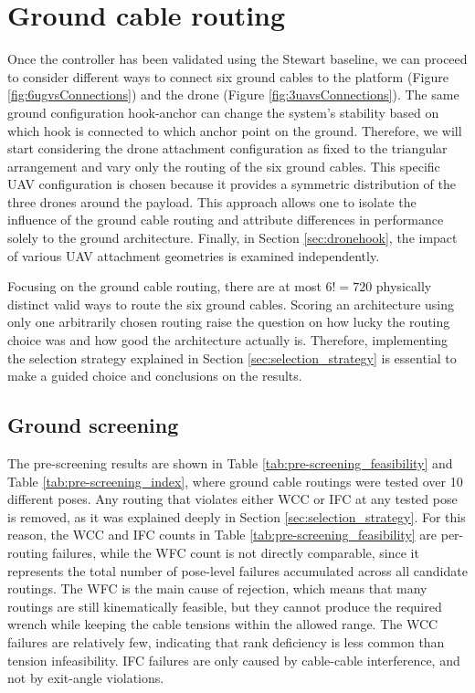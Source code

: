 
\section{Ground cable routing}

Once the controller has been validated using the Stewart baseline, we can proceed to consider different ways to connect six ground cables to the platform (Figure \ref{fig:6ugvsConnections}) and the drone (Figure \ref{fig:3uavsConnections}). The same ground configuration hook-anchor can change the system's stability based on which hook is connected to which anchor point on the ground.
Therefore, we will start considering the drone attachment configuration as fixed to the triangular arrangement and vary only the routing of the six ground cables. This specific UAV configuration is chosen because it provides a symmetric distribution of the three drones around the payload. This approach allows one to isolate the influence of the ground cable routing and attribute differences in performance solely to the ground architecture. Finally, in Section \ref{sec:dronehook}, the impact of various UAV attachment geometries is examined independently.

Focusing on the ground cable routing, there are at most $6! = 720$ physically distinct valid ways to route the six ground cables. Scoring an architecture using only one arbitrarily chosen routing raise the question on how lucky the routing choice was and how good the architecture actually is. Therefore, implementing the selection strategy explained in Section \ref{sec:selection_strategy} is essential to make a guided choice and conclusions on the results.

\subsection{Ground screening}
\label{sec:ground_screening}
The pre-screening results are shown in Table \ref{tab:pre-screening_feasibility} and Table \ref{tab:pre-screening_index}, where ground cable routings were tested over 10 different poses.
Any routing that violates either WCC or IFC at any tested pose is removed, as it was explained deeply in Section \ref{sec:selection_strategy}.  For this reason, the WCC and IFC counts in Table \ref{tab:pre-screening_feasibility} are per-routing failures, while the WFC count is not directly comparable, since it represents the total number of pose-level failures accumulated across all candidate routings. The WFC is the main cause of rejection, which means that many routings are still kinematically feasible, but they cannot produce the required wrench while keeping the cable tensions within the allowed range. The WCC failures are relatively few, indicating that rank deficiency is less common than tension infeasibility. IFC failures are only  caused by cable-cable interference, and not by exit-angle violations.

